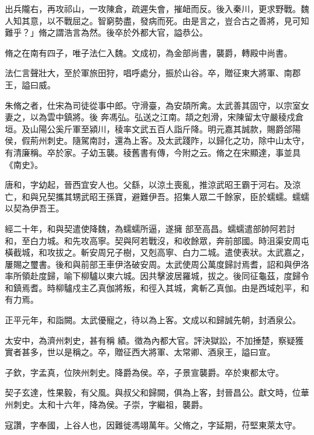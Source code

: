 \begin{pinyinscope}
 出兵隴右，再攻祁山，一攻陳倉，疏遲失會，摧衄而反。後入秦川，更求野戰。魏人知其意，以不戰屈之。智窮勢盡，發病而死。由是言之，豈合古之善將，見可知難乎？」脩之謂浩言為然。後卒於外都大官，謚恭公。



 脩之在南有四子，唯子法仁入魏。文成初，為金部尚書，襲爵，轉殿中尚書。



 法仁言聲壯大，至於軍旅田狩，唱呼處分，振於山谷。卒，贈征東大將軍、南郡王，謚曰威。



 朱脩之者，仕宋為司徒從事中郎。守滑臺，為安頡所禽。太武善其固守，以宗室女妻之，以為雲中鎮將。後
 奔馮弘。弘送之江南。頡之剋滑，宋陳留太守嚴稜戍倉垣。及山陽公奚斤軍至潁川，稜率文武五百人詣斤降。明元嘉其誠款，賜爵郃陽侯，假荊州刺史。隨駕南討，還為上客。及太武踐阼，以歸化之功，除中山太守，有清廉稱。卒於家。子幼玉襲。稜舊書有傳，今附之云。脩之在宋顯達，事並具《南史》。



 唐和，字幼起，晉西宜安人也。父繇，以涼土喪亂，推涼武昭王霸于河右。及涼亡，和與兄契攜其甥武昭王孫寶，避難伊吾。招集人眾二千餘家，臣於蠕蠕。蠕蠕以契為伊吾王。



 經二十年，和與契遣使降魏，為蠕蠕所逼，遂擁
 部至高昌。蠕蠕遣部帥阿若討和，至白力城。和先攻高寧。契與阿若戰沒，和收餘眾，奔前部國。時沮渠安周屯橫截城，和攻拔之。斬安周兄子樹，又剋高寧、白力二城。遣使表狀。太武嘉之，屢賜之璽書。後和與前部王車伊洛破安周。太武使周公萬度歸討焉耆，詔和與伊洛率所領赴度歸，喻下柳驢以東六城。因共擊波居羅城，拔之。後同征龜茲，度歸令和鎮焉耆。時柳驢戍主乙真伽將叛，和徑入其城，禽斬乙真伽。由是西域剋平，和有力焉。



 正平元年，和詣闕。太武優寵之，待以為上客。文成以和歸誠先朝，封酒泉公。



 太安中，為濟州刺史，甚有稱
 績。徵為內都大官。評決獄訟，不加捶楚，察疑獲實者甚多，世以是稱之。卒，贈征西大將軍、太常卿、酒泉王，謚曰宣。



 子欽，字孟真，位陜州刺史。降爵為侯。卒，子景宣襲爵。卒於東都太守。



 契子玄達，性果毅，有父風。與叔父和歸闕，俱為上客，封晉昌公。獻文時，位華州刺史。太和十六年，降為侯。子崇，字繼祖，襲爵。



 寇讚，字奉國，上谷人也，因難徙馮翊萬年。父脩之，字延期，苻堅東萊太守。




\end{pinyinscope}

